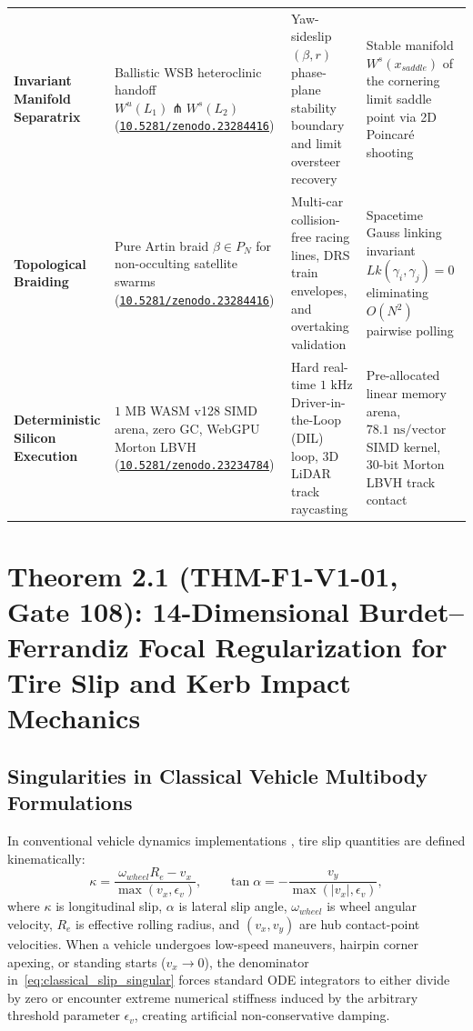 \documentclass[11pt,a4paper,reqno]{article}
\def\bm#1{#1}%
\def\texttt#1{#1}%
\def\mathrm#1{#1}%
\def\mathcal#1{#1}%
\newcommand{\zenodo}[1]{\href{https://doi.org/10.5281/zenodo.#1}{\nolinkurl{10.5281/zenodo.#1}}}
\theoremstyle{plain}
\theoremstyle{definition}
\theoremstyle{remark}
\numberwithin{equation}{section}
\begin{document}
\begin{table}[H]
\begin{tabularx}{\textwidth}{@{}p{3.0cm}p{3.4cm}p{3.4cm}Y@{}}
\textbf{Invariant Manifold Separatrix} & Ballistic WSB heteroclinic handoff $W^u(L_1) \pitchfork W^s(L_2)$ (\zenodo{23284416}) & Yaw-sideslip $(\beta, r)$ phase-plane stability boundary and limit oversteer recovery & Stable manifold $W^s(\bm{x}_{\mathrm{saddle}})$ of the cornering limit saddle point via 2D Poincar\'{e} shooting \\
\textbf{Topological Braiding} & Pure Artin braid $\beta \in \mathcal{P}_N$ for non-occulting satellite swarms (\zenodo{23284416}) & Multi-car collision-free racing lines, DRS train envelopes, and overtaking validation & Spacetime Gauss linking invariant $\mathrm{Lk}(\bm{\gamma}_i, \bm{\gamma}_j) = 0$ eliminating $\mathcal{O}(N^2)$ pairwise polling \\
\textbf{Deterministic Silicon Execution} & $1\text{ MB}$ WASM \texttt{v128} SIMD arena, zero GC, WebGPU Morton LBVH (\zenodo{23234784}) & Hard real-time $1\text{ kHz}$ Driver-in-the-Loop (DIL) loop, 3D LiDAR track raycasting & Pre-allocated linear memory arena, $78.1\text{ ns/vector}$ SIMD kernel, 30-bit Morton LBVH track contact \\
\bottomrule
\end{tabularx}
\end{table}

\section{\texorpdfstring{Theorem 2.1 (\texttt{THM-F1-V1-01}, Gate 108): 14-Dimensional Burdet--Ferrandiz Focal Regularization for Tire Slip and Kerb Impact Mechanics}{Theorem 2.1 (THM-F1-V1-01, Gate 108): 14-Dimensional Burdet-Ferrandiz Focal Regularization for Tire Slip and Kerb Impact Mechanics}}

\subsection{Singularities in Classical Vehicle Multibody Formulations}
In conventional vehicle dynamics implementations \cite{Pacejka2012, Milliken1995}, tire slip quantities are defined kinematically:
\begin{equation}
  \kappa = \frac{\omega_{\mathrm{wheel}} R_e - v_x}{\max(v_x, \epsilon_v)}, \qquad \tan\alpha = -\frac{v_y}{\max(|v_x|, \epsilon_v)},
  \label{eq:classical_slip_singular}
\end{equation}
where $\kappa$ is longitudinal slip, $\alpha$ is lateral slip angle, $\omega_{\mathrm{wheel}}$ is wheel angular velocity, $R_e$ is effective rolling radius, and $(v_x, v_y)$ are hub contact-point velocities. When a vehicle undergoes low-speed maneuvers, hairpin corner apexing, or standing starts ($v_x \to 0$), the denominator in~\eqref{eq:classical_slip_singular} forces standard ODE integrators to either divide by zero or encounter extreme numerical stiffness induced by the arbitrary threshold parameter $\epsilon_v$, creating artificial non-conservative damping.
\end{document}
